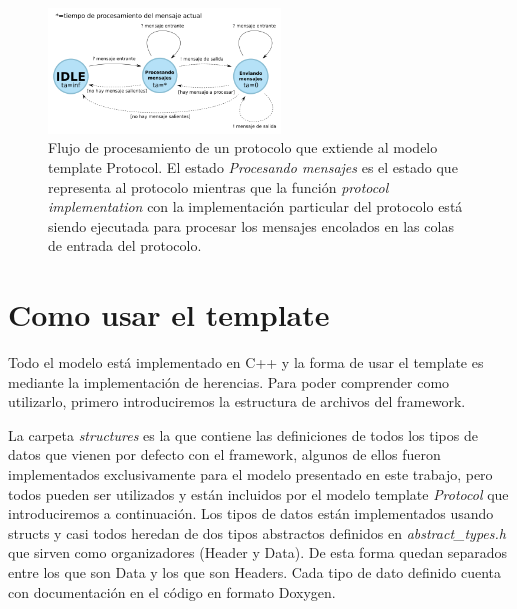 \documentclass[10pt,a4paper]{article}
\begin{document}
\begin{figure}[!bht]
    \centering
    \includegraphics[width = 0.55\textwidth]{img/png/processing_flow.png}
    \caption{Flujo de procesamiento de un protocolo que extiende al modelo template Protocol. El estado \textit{Procesando mensajes} es el estado que representa al protocolo mientras que la función \textit{protocol implementation} con la implementación particular del protocolo está siendo ejecutada para procesar los mensajes encolados en las colas de entrada del protocolo.}
    \label{figure:processing flow}
\end{figure}

\newpage

\section{Como usar el template}

Todo el modelo está implementado en C++ y la forma de usar el template es mediante la implementación de herencias. Para poder comprender como utilizarlo, primero introduciremos la estructura de archivos del framework. \\


\medskip

La carpeta \textit{structures} es la que contiene las definiciones de todos los tipos de datos que vienen por defecto con el framework, algunos de ellos fueron implementados exclusivamente para el modelo presentado en este trabajo, pero todos pueden ser utilizados y están incluidos por el modelo template \textit{Protocol} que introduciremos a continuación. Los tipos de datos están implementados usando structs y casi todos heredan de dos tipos abstractos definidos en \textit{abstract\_types.h} que sirven como organizadores (Header y Data). De esta forma quedan separados entre los que son Data y los que son Headers. Cada tipo de dato definido cuenta con documentación en el código en formato Doxygen. \\
\end{document}
